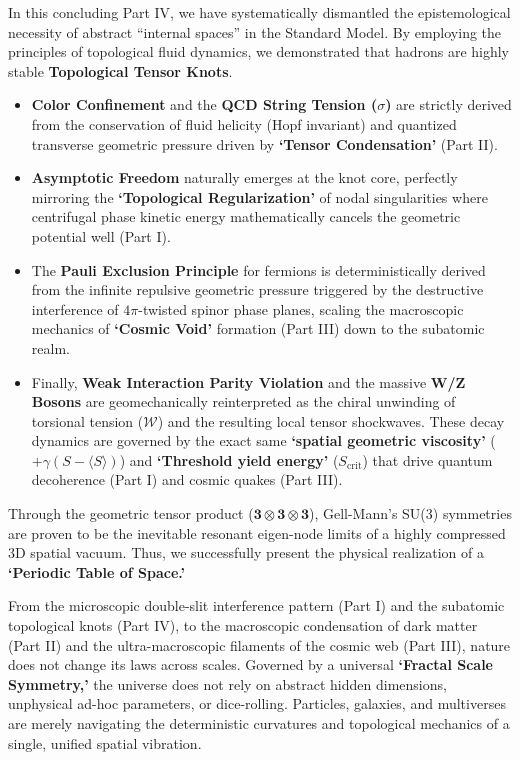 \documentclass[reprint,amsmath,amssymb,aps,prd]{revtex4-2}
\begin{document}
In this concluding Part IV, we have systematically dismantled the epistemological necessity of abstract ``internal spaces'' in the Standard Model. By employing the principles of topological fluid dynamics, we demonstrated that hadrons are highly stable \textbf{Topological Tensor Knots}.

\begin{itemize}
    \item \textbf{Color Confinement} and the \textbf{QCD String Tension ($\sigma$)} are strictly derived from the conservation of fluid helicity (Hopf invariant) and quantized transverse geometric pressure driven by \textbf{`Tensor Condensation'} (Part II).
    \item \textbf{Asymptotic Freedom} naturally emerges at the knot core, perfectly mirroring the \textbf{`Topological Regularization'} of nodal singularities where centrifugal phase kinetic energy mathematically cancels the geometric potential well (Part I).
    \item The \textbf{Pauli Exclusion Principle} for fermions is deterministically derived from the infinite repulsive geometric pressure triggered by the destructive interference of $4\pi$-twisted spinor phase planes, scaling the macroscopic mechanics of \textbf{`Cosmic Void'} formation (Part III) down to the subatomic realm.
    \item Finally, \textbf{Weak Interaction Parity Violation} and the massive \textbf{W/Z Bosons} are geomechanically reinterpreted as the chiral unwinding of torsional tension ($\mathcal{W}$) and the resulting local tensor shockwaves. These decay dynamics are governed by the exact same \textbf{`spatial geometric viscosity'} ($+\gamma(S - \langle S \rangle)$) and \textbf{`Threshold yield energy'} ($S_{\mathrm{crit}}$) that drive quantum decoherence (Part I) and cosmic quakes (Part III).
\end{itemize}

Through the geometric tensor product ($\mathbf{3} \otimes \mathbf{3} \otimes \mathbf{3}$), Gell-Mann's SU(3) symmetries are proven to be the inevitable resonant eigen-node limits of a highly compressed 3D spatial vacuum. Thus, we successfully present the physical realization of a \textbf{`Periodic Table of Space.'}

From the microscopic double-slit interference pattern (Part I) and the subatomic topological knots (Part IV), to the macroscopic condensation of dark matter (Part II) and the ultra-macroscopic filaments of the cosmic web (Part III), nature does not change its laws across scales. Governed by a universal \textbf{`Fractal Scale Symmetry,'} the universe does not rely on abstract hidden dimensions, unphysical ad-hoc parameters, or dice-rolling. Particles, galaxies, and multiverses are merely navigating the deterministic curvatures and topological mechanics of a single, unified spatial vibration.
\end{document}
